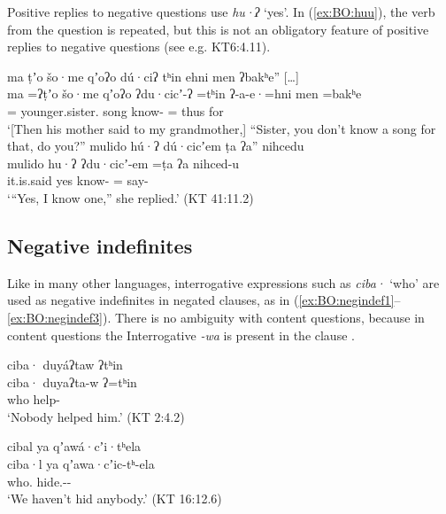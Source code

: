 \documentclass[output=paper,modfonts,nonflat,colorlinks,citecolor=brown]{langscibook}
\begin{document}
Positive replies to negative questions use \textit{hu·ʔ} `yes'. In (\ref{ex:BO:huu}), the verb from the question is repeated, but this is not an obligatory feature of positive replies to negative questions (see e.g. KT6:4.11). 

\ea 
\label{ex:BO:huu}
\begin{xlist}
\ex
\glll {[\ldots] } ma ṭʼo šo·me qʼoʔo dú·ciʔ tʰin ehni men ʔbakʰe'' [\ldots]\\ %
    {} ma =ʔṭʼo šo·me qʼoʔo ʔdu·cicʼ-ʔ =tʰin ʔ-a-e·=hni men =bakʰe {}\\
    {}  = younger.sister. song know- =  thus for\\
\glt `[Then his mother said to my grandmother,] ``Sister, you don’t know a song for that, do you?”
\ex
\glll mulido hú·ʔ dú·cicʼem ṭa ʔa'' nihcedu\\
    mulido hu·ʔ ʔdu·cicʼ-em =ṭa ʔa nihced-u\\
    it.is.said yes know- =  say-\\
\glt `“Yes, I know one,” she replied.' ({KT 41:11.2})\\
\end{xlist}
\z


\subsection{Negative indefinites}
\label{sec:BO:negindef}

Like in many other languages, interrogative expressions such as \textit{ciba·} `who' are used as negative indefinites in negated clauses, as in (\ref{ex:BO:negindef1}--\ref{ex:BO:negindef3}). There is no ambiguity with content questions, because in content questions the Interrogative \textit{-wa} is present in the clause \citep[286]{Oswalt1961}.

{%
\ea 
\label{ex:BO:negindef1}
\glll ciba· duyáʔtaw ʔtʰin\\
    ciba· duyaʔta-w ʔ=tʰin\\
    who help- \\
\glt `Nobody helped him.' ({KT 2:4.2})\\
\z
}%


\ea 
\label{ex:BO:hide}
\glll cibal ya qʼawá·cʼi·tʰela\\
    ciba·l ya qʼawa·cʼic-tʰ-ela\\
    who.  hide.--\\
\glt `We haven’t hid anybody.' ({KT 16:12.6})\\
\z
\end{document}
